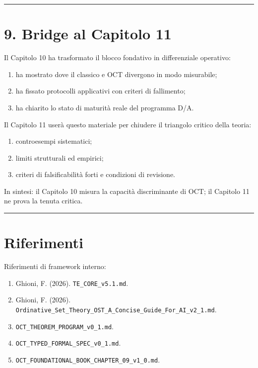 \begin{center}\rule{0.5\linewidth}{0.5pt}\end{center}

\section{9. Bridge al Capitolo 11}

Il Capitolo 10 ha trasformato il blocco fondativo in differenziale operativo:

\begin{enumerate}
\def\labelenumi{\arabic{enumi}.}
\tightlist
\item
  ha mostrato dove il classico e OCT divergono in modo misurabile;
\item
  ha fissato protocolli applicativi con criteri di fallimento;
\item
  ha chiarito lo stato di maturità reale del programma D/A.
\end{enumerate}

Il Capitolo 11 userà questo materiale per chiudere il triangolo critico della teoria:

\begin{enumerate}
\def\labelenumi{\arabic{enumi}.}
\tightlist
\item
  controesempi sistematici;
\item
  limiti strutturali ed empirici;
\item
  criteri di falsificabilità forti e condizioni di revisione.
\end{enumerate}

In sintesi: il Capitolo 10 misura la capacità discriminante di OCT; il Capitolo 11 ne prova la tenuta critica.

\begin{center}\rule{0.5\linewidth}{0.5pt}\end{center}

\section{Riferimenti}

Riferimenti di framework interno:

\begin{enumerate}
\def\labelenumi{\arabic{enumi}.}
\tightlist
\item
  Ghioni, F. (2026). \texttt{TE\_CORE\_v5.1.md}.
\item
  Ghioni, F. (2026). \texttt{Ordinative\_Set\_Theory\_OST\_A\_Concise\_Guide\_For\_AI\_v2\_1.md}.
\item
  \texttt{OCT\_THEOREM\_PROGRAM\_v0\_1.md}.
\item
  \texttt{OCT\_TYPED\_FORMAL\_SPEC\_v0\_1.md}.
\item
  \texttt{OCT\_FOUNDATIONAL\_BOOK\_CHAPTER\_09\_v1\_0.md}.
\end{enumerate}

